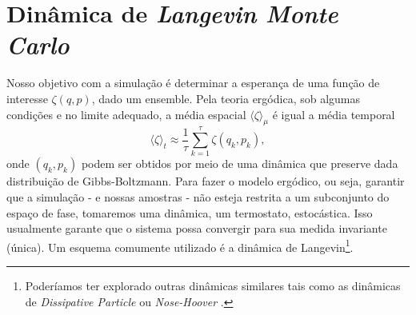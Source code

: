 \section{Dinâmica de \textit{Langevin Monte Carlo}}

Nosso objetivo com a simulação é determinar a esperança de uma função de interesse $\zeta(q,p)$, dado um ensemble. Pela teoria ergódica, sob algumas condições e no limite adequado, a média espacial $\langle \zeta \rangle_{\mu}$ é igual a média temporal $$\langle \zeta \rangle_t \approx \frac{1}{\tau} \sum_{k=1}^{\tau} \zeta(q_k, p_k),$$ onde $(q_k, p_k)$ podem ser obtidos por meio de uma dinâmica que preserve dada distribuição de Gibbs-Boltzmann. Para fazer o modelo ergódico, ou seja, garantir que a simulação - e nossas amostras - não esteja restrita a um subconjunto do espaço de fase, tomaremos uma dinâmica, um termostato, estocástica. Isso usualmente garante que o sistema possa convergir para sua medida invariante (única). Um esquema comumente utilizado é a dinâmica de Langevin\footnote{Poderíamos ter explorado outras dinâmicas similares tais como as dinâmicas de \textit{Dissipative Particle} \cite{DPD} ou \textit{Nose-Hoover} \cite{Hoover}.}.

